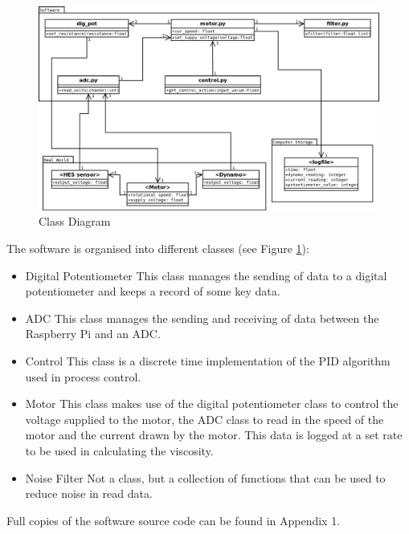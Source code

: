 \documentclass[twoside,a4]{report}
\def\rpi{Raspberry Pi }
\begin{document}
	\begin{figure}[!htb]
		\centering
		\includegraphics[scale=0.35]{images/codemap.png}
		\caption{Class Diagram}
		\label{figcladia}
	\end{figure}
	
	\noindent
	The software is organised into different classes (see Figure \ref{figcladia}):
	\begin{itemize}
		\item Digital Potentiometer \newline 
		This class manages the sending of data to a digital potentiometer and keeps a record of some key data.
		\item ADC \newline 
		This class manages the sending and receiving of data between the \rpi and an ADC.
		\item Control\newline 
		This class is a discrete time implementation of the PID algorithm used in process control.
		\item Motor \newline
		This class makes use of the digital potentiometer class to control the voltage supplied to the motor, the ADC class to read in the speed of the motor and the current drawn by the motor. This data is logged at a set rate to be used in calculating the viscosity.
		\item Noise Filter \newline
		Not a class, but a collection of functions that can be used to reduce noise in read data.
	\end{itemize}
	Full copies of the software source code can be found in Appendix 1.
	
\end{document}
